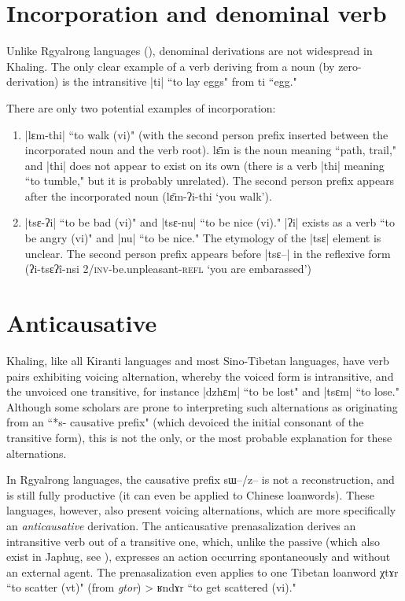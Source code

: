 \documentclass[oldfontcommands,oneside,a4paper,11pt]{article}
\newcommand{\ipa}[1]{{\phon #1}} %
\newcommand{\dhatu}[1]{|\ipa{#1}|}
\begin{document}
\section{Incorporation and denominal verb}
Unlike Rgyalrong languages (\citealt{jacques12incorp}), denominal derivations are not widespread in Khaling. The only clear example of a verb deriving from a noun (by zero-derivation) is the intransitive \dhatu{ti} ``to lay eggs" from \ipa{ti} ``egg."


There are only two potential examples of incorporation:

\begin{enumerate}
\item \dhatu{lɛm-thi} ``to walk (vi)" (with the second person prefix inserted between the incorporated noun and the verb root). \ipa{lɛ̄m} is the noun meaning ``path, trail," and \dhatu{thi} does not appear to exist on its own (there is a verb \dhatu{thi} meaning ``to tumble," but it is probably unrelated). The second person prefix appears after the incorporated noun (\ipa{lɛ̄m-ʔi-thi} `you walk').
\item \dhatu{tsɛ-ʔi} ``to be bad (vi)" and \dhatu{tsɛ-nu} ``to be nice (vi)." \dhatu{ʔi} exists as a verb ``to be angry (vi)" and \dhatu{nu} ``to be nice." The etymology of the \dhatu{tsɛ} element is unclear. The second person prefix appears before |tsɛ--| in the reflexive form (\ipa{ʔi-tsɛʔî-nsi} \textsc{2/inv}-be.unpleasant-\textsc{refl} `you are embarassed')
\end{enumerate}

\section{Anticausative}
Khaling, like all Kiranti languages and most Sino-Tibetan languages, have verb pairs exhibiting voicing alternation, whereby the voiced form is intransitive, and the unvoiced one transitive, for instance \dhatu{dzhɛm} ``to be lost" and \dhatu{tsɛm} ``to lose." Although some scholars are prone to interpreting such alternations as originating from an ``*s- causative prefix" (which devoiced the initial consonant of the transitive form), this is not the only, or the most probable explanation for these alternations.

In Rgyalrong languages, the causative prefix \ipa{sɯ--/z--} is not a reconstruction, and is still fully productive (it can even be applied to Chinese loanwords). These languages, however, also present voicing alternations, which are more specifically an \textit{anticausative} derivation. The anticausative prenasalization derives an intransitive verb out of a transitive one, which, unlike the passive (which also exist in Japhug, see \citealt{jacques12demotion}), expresses an action occurring spontaneously and without an external agent. The prenasalization even applies to one Tibetan loanword \ipa{χtɤr} ``to scatter (vt)" (from \textit{gtor}) > \ipa{ʁndɤr} ``to get scattered (vi)."
\end{document}
